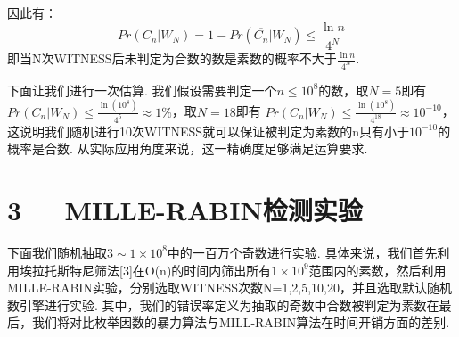 \documentclass[UTF8]{ctexart}
\begin{document}
因此有：
\begin{equation}
        Pr(C_n|W_N)=1-Pr(\overline{C_n}|W_N)\le \frac{\ln n}{4^N}
\end{equation}
即当N次WITNESS后未判定为合数的数是素数的概率不大于$\frac{\ln n}{4^N}$.\par
下面让我们进行一次估算. 我们假设需要判定一个$n\le 10^{8}$的数，取$N=5$即有 $Pr(C_n|W_N)\le \frac{\ln (10^{8})}{4^5}\approx 1\%$，取$N=18$即有 $Pr(C_n|W_N)\le \frac{\ln (10^{8})}{4^{18}}\approx 10^{-10}$，这说明我们随机进行10次WITNESS就可以保证被判定为素数的n只有小于$10^{-10}$的概率是合数. 从实际应用角度来说，这一精确度足够满足运算要求.\par
\section*{3\ \ \ MILLE-RABIN检测实验}
下面我们随机抽取$3\sim 1\times 10^8$中的一百万个奇数进行实验. 具体来说，我们首先利用埃拉托斯特尼筛法[3]在O(n)的时间内筛出所有$1\times 10^9$范围内的素数，然后利用MILLE-RABIN实验，分别选取WITNESS次数N=1,2,5,10,20，并且选取默认随机数引擎进行实验. 其中，我们的错误率定义为抽取的奇数中合数被判定为素数在最后，我们将对比枚举因数的暴力算法与MILL-RABIN算法在时间开销方面的差别.
\end{document}
